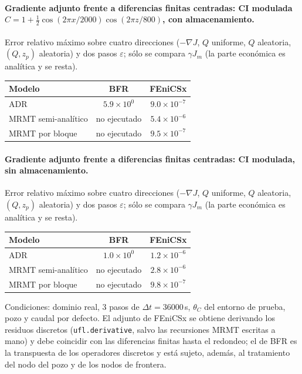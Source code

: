 \paragraph{Gradiente adjunto frente a diferencias finitas centradas: CI modulada $C=1+\tfrac12\cos(2\pi x/2000)\cos(2\pi z/800)$, con almacenamiento.}
Error relativo m\'aximo sobre cuatro direcciones ($-\nabla J$, $Q$ uniforme, $Q$ aleatoria, $(Q,z_p)$ aleatoria) y dos pasos $\varepsilon$; s\'olo se compara $\gamma J_m$ (la parte econ\'omica es anal\'itica y se resta).
\begin{center}\small\begin{tabular}{lcc}\toprule Modelo & BFR & FEniCSx\\\midrule
ADR & $5.9\times10^{0}$ & $9.0\times10^{-7}$\\
MRMT semi-anal\'itico & no ejecutado & $5.4\times10^{-6}$\\
MRMT por bloque & no ejecutado & $9.5\times10^{-7}$\\
\bottomrule\end{tabular}\end{center}
\paragraph{Gradiente adjunto frente a diferencias finitas centradas: CI modulada, sin almacenamiento.}
Error relativo m\'aximo sobre cuatro direcciones ($-\nabla J$, $Q$ uniforme, $Q$ aleatoria, $(Q,z_p)$ aleatoria) y dos pasos $\varepsilon$; s\'olo se compara $\gamma J_m$ (la parte econ\'omica es anal\'itica y se resta).
\begin{center}\small\begin{tabular}{lcc}\toprule Modelo & BFR & FEniCSx\\\midrule
ADR & $1.0\times10^{0}$ & $1.2\times10^{-6}$\\
MRMT semi-anal\'itico & no ejecutado & $2.8\times10^{-6}$\\
MRMT por bloque & no ejecutado & $9.8\times10^{-7}$\\
\bottomrule\end{tabular}\end{center}

Condiciones: dominio real, 3 pasos de $\Delta t=36000$\,s, $\theta_C$ del entorno de prueba, pozo y caudal por defecto.
El adjunto de FEniCSx se obtiene derivando los residuos discretos (\texttt{ufl.derivative}, salvo las recursiones MRMT escritas a mano) y
debe coincidir con las diferencias finitas hasta el redondeo; el de BFR es la transpuesta de los operadores discretos y
est\'a sujeto, adem\'as, al tratamiento del nodo del pozo y de los nodos de frontera.

